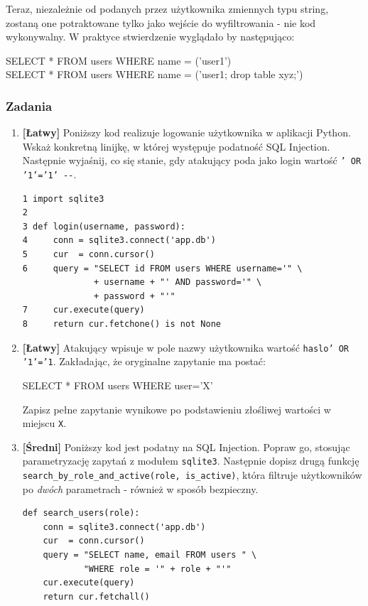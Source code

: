\documentclass[12pt,a4paper]{article}
\begin{document}
Teraz, niezależnie od podanych przez użytkownika zmiennych typu string, zostaną one potraktowane tylko jako wejście do wyfiltrowania - 
nie kod wykonywalny. W praktyce stwierdzenie wyglądało by następująco:
\begin{tcolorbox}
SELECT * FROM users WHERE name = ('user1') \\
SELECT * FROM users WHERE name = ('user1; drop table xyz;')
\end{tcolorbox}


\subsubsection{Zadania}
 
\begin{enumerate}
 
\item \textbf{[Łatwy]} Poniższy kod realizuje logowanie użytkownika w aplikacji Python. Wskaż konkretną linijkę, w której
występuje podatność SQL Injection. Następnie wyjaśnij, co się stanie, gdy atakujący poda jako login wartość
\texttt{' OR '1'='1' -{}-}.
\begin{tcolorbox}
\begin{verbatim}
1 import sqlite3
2  
3 def login(username, password):
4     conn = sqlite3.connect('app.db')
5     cur  = conn.cursor()
6     query = "SELECT id FROM users WHERE username='" \
              + username + "' AND password='" \
              + password + "'"
7     cur.execute(query)
8     return cur.fetchone() is not None
\end{verbatim}
\end{tcolorbox}

\item \textbf{[Łatwy]} Atakujący wpisuje w pole nazwy użytkownika wartość \texttt{haslo' OR '1'='1}. Zakładając, że oryginalne zapytanie ma
postać:
\begin{tcolorbox}
SELECT * FROM users WHERE user='X'
\end{tcolorbox}
Zapisz pełne zapytanie wynikowe po podstawieniu złośliwej wartości w miejscu \texttt{X}. 


\item \textbf{[Średni]} Poniższy kod jest podatny na SQL Injection.
Popraw go, stosując parametryzację zapytań z modułem \texttt{sqlite3}. Następnie dopisz drugą funkcję \\
\texttt{search\_by\_role\_and\_active(role, is\_active)}, która filtruje użytkowników po \emph{dwóch} parametrach - również w sposób bezpieczny.
\begin{tcolorbox}
\begin{verbatim}
def search_users(role):
    conn = sqlite3.connect('app.db')
    cur  = conn.cursor()
    query = "SELECT name, email FROM users " \
            "WHERE role = '" + role + "'"
    cur.execute(query)
    return cur.fetchall()
\end{verbatim}
\end{tcolorbox}


\end{enumerate}
\end{document}
